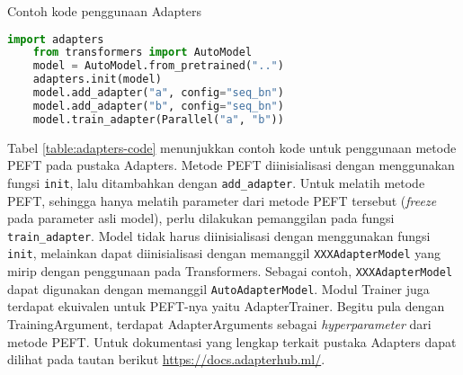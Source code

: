 \begin{table}[h]
    \caption{Contoh kode penggunaan Adapters}
    \label{table:adapters-code}
    \begin{lstlisting}[language=python]
    import adapters
    from transformers import AutoModel
    model = AutoModel.from_pretrained("..")
    adapters.init(model)
    model.add_adapter("a", config="seq_bn")
    model.add_adapter("b", config="seq_bn")
    model.train_adapter(Parallel("a", "b"))
    \end{lstlisting}
\end{table}

Tabel \ref{table:adapters-code} menunjukkan contoh kode untuk penggunaan metode PEFT pada pustaka Adapters. Metode PEFT diinisialisasi dengan menggunakan fungsi \texttt{init}, lalu ditambahkan dengan \texttt{add\_adapter}. Untuk melatih metode PEFT, sehingga hanya melatih parameter dari metode PEFT tersebut (\textit{freeze} pada parameter asli model), perlu dilakukan pemanggilan pada fungsi \texttt{train\_adapter}. Model tidak harus diinisialisasi dengan menggunakan fungsi \texttt{init}, melainkan dapat diinisialisasi dengan memanggil \texttt{XXXAdapterModel} yang mirip dengan penggunaan pada Transformers. Sebagai contoh, \texttt{XXXAdapterModel} dapat digunakan dengan memanggil \texttt{AutoAdapterModel}. Modul Trainer juga terdapat ekuivalen untuk PEFT-nya yaitu AdapterTrainer. Begitu pula dengan TrainingArgument, terdapat AdapterArguments sebagai \textit{hyperparameter} dari metode PEFT. Untuk dokumentasi yang lengkap terkait pustaka Adapters dapat dilihat pada tautan berikut \url{https://docs.adapterhub.ml/}.
